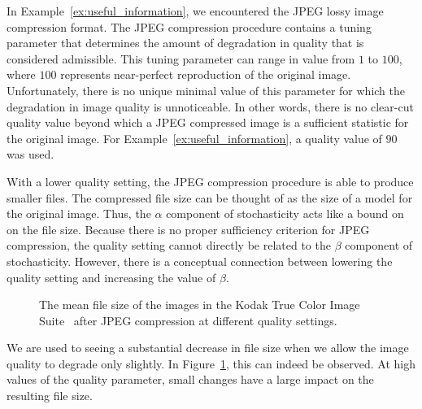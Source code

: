 \begin{example}
  In Example~\ref{ex:useful_information}, we encountered the JPEG lossy image compression format.
  The JPEG compression procedure contains a tuning parameter that determines the amount of degradation in quality that is considered admissible.
  This tuning parameter can range in value from $1$ to $100$, where $100$ represents near-perfect reproduction of the original image.
  Unfortunately, there is no unique minimal value of this parameter for which the degradation in image quality is unnoticeable.
  In other words, there is no clear-cut quality value beyond which a JPEG compressed image is a sufficient statistic for the original image.
  For Example~\ref{ex:useful_information}, a quality value of $90$ was used.

  With a lower quality setting, the JPEG compression procedure is able to produce smaller files.
  The compressed file size can be thought of as the size of a model for the original image.
  Thus, the $\alpha$ component of stochasticity acts like a bound on on the file size.
  Because there is no proper sufficiency criterion for JPEG compression, the quality setting cannot directly be related to the $\beta$ component of stochasticity.
  However, there is a conceptual connection between lowering the quality setting and increasing the value of $\beta$.

  \begin{figure}
    \centering
    \caption{
      The mean file size of the images in the Kodak True Color Image Suite~\parencite{franzen1999kodak} after JPEG compression at different quality settings.
    }
    \label{fig:jpeg_q}
  \end{figure}
  We are used to seeing a substantial decrease in file size when we allow the image quality to degrade only slightly.
  In Figure~\ref{fig:jpeg_q}, this can indeed be observed.
  At high values of the quality parameter, small changes have a large impact on the resulting file size.
\end{example}

